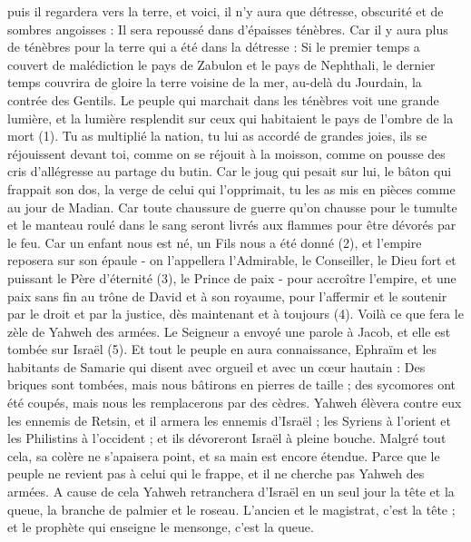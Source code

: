 \begin{multicols}{2}
puis il regardera vers la terre, et voici, il n’y aura que détresse, obscurité et de sombres angoisses : Il sera repoussé dans d’épaisses ténèbres.
Car il y aura plus de ténèbres pour la terre qui a été dans la détresse : Si le premier temps a couvert de malédiction le pays de Zabulon et le pays de Nephthali, le dernier temps couvrira de gloire la terre voisine de la mer, au-delà du Jourdain, la contrée des Gentils.
\VerseOne{}Le peuple qui marchait dans les ténèbres voit une grande lumière, et la lumière resplendit sur ceux qui habitaient le pays de l'ombre de la mort (1).
Tu as multiplié la nation, tu lui as accordé de grandes joies, ils se réjouissent devant toi, comme on se réjouit à la moisson, comme on pousse des cris d’allégresse au partage du butin.
Car le joug qui pesait sur lui, le bâton qui frappait son dos, la verge de celui qui l’opprimait, tu les as mis en pièces comme au jour de Madian.
Car toute chaussure de guerre qu’on chausse pour le tumulte et le manteau roulé dans le sang seront livrés aux flammes pour être dévorés par le feu.
Car un enfant nous est né, un Fils nous a été donné (2), et l'empire reposera sur son épaule - on l’appellera l'Admirable, le Conseiller, le Dieu fort et puissant le Père d'éternité (3), le Prince de paix -
pour accroître l’empire, et une paix sans fin au trône de David et à son royaume, pour l'affermir et le soutenir par le droit et par la justice, dès maintenant et à toujours (4). Voilà ce que fera le zèle de Yahweh des armées.
Le Seigneur a envoyé une parole à Jacob, et elle est tombée sur Israël (5).
Et tout le peuple en aura connaissance, Ephraïm et les habitants de Samarie qui disent avec orgueil et avec un cœur hautain :
Des briques sont tombées, mais nous bâtirons en pierres de taille ; des sycomores ont été coupés, mais nous les remplacerons par des cèdres.
Yahweh élèvera contre eux les ennemis de Retsin, et il armera les ennemis d'Israël ;
les Syriens à l’orient et les Philistins à l’occident ; et ils dévoreront Israël à pleine bouche. Malgré tout cela, sa colère ne s’apaisera point, et sa main est encore étendue.
Parce que le peuple ne revient pas à celui qui le frappe, et il ne cherche pas Yahweh des armées.
A cause de cela Yahweh retranchera d'Israël en un seul jour la tête et la queue, la branche de palmier et le roseau.
L'ancien et le magistrat, c'est la tête ; et le prophète qui enseigne le mensonge, c'est la queue.

\end{multicols}
